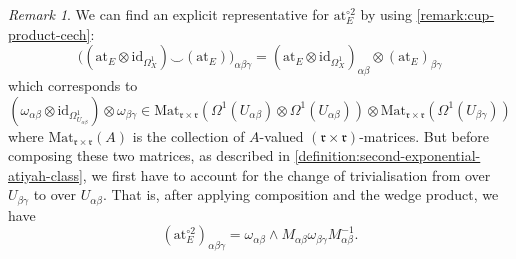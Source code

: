 \documentclass[11pt,fleqn]{article}
\theoremstyle{plain}
\theoremstyle{definition}
\theoremstyle{remark}
\newtheorem{remark}[theorem]{Remark}
\numberwithin{equation}{theorem}
\newcommand{\id}{\mathrm{id}}
\newcommand{\at}{\mathrm{at}}
\newcommand{\expat}[1]{\at^{\circ#1}}
\renewcommand{\matrix}{\mathrm{Mat}}
\begin{document}
        \begin{remark}\label{remark:have-to-change-base-for-higher-atiyah-class}
            We can find an explicit representative for $\expat{2}_E$ by using \cref{remark:cup-product-cech}:
            \[
                \big((\at_E\otimes\id_{\Omega_X^1})\smile(\at_E)\big)_{\alpha\beta\gamma}
                =
                \left(\at_E\otimes\id_{\Omega_X^1}\right)_{\alpha\beta}\otimes(\at_E)_{\beta\gamma}
            \]
            which corresponds to
            \[
                \left(\omega_{\alpha\beta}\otimes\id_{\Omega_{U_{\alpha\beta}}^1}\right)\otimes\omega_{\beta\gamma}
                \in
                \matrix_{\mathfrak{r}\times\mathfrak{r}}\left(
                    \Omega^1(U_{\alpha\beta}) \otimes \Omega^1(U_{\alpha\beta})
                \right) \otimes \matrix_{\mathfrak{r}\times\mathfrak{r}}\left(
                    \Omega^1(U_{\beta\gamma})
                \right)
            \]
            where $\matrix_{\mathfrak{r}\times\mathfrak{r}}(A)$ is the collection of $A$-valued $(\mathfrak{r}\times \mathfrak{r})$-matrices.
            But before composing these two matrices, as described in \cref{definition:second-exponential-atiyah-class}, we first have to account for the change of trivialisation from over $U_{\beta\gamma}$ to over $U_{\alpha\beta}$.
            That is, after applying composition and the wedge product, we have
            \begin{equation*}
                \left(\expat{2}_{E}\right)_{\alpha\beta\gamma} = \omega_{\alpha\beta}\wedge M_{\alpha\beta}\omega_{\beta\gamma}M_{\alpha\beta}^{-1}.
            \end{equation*}
        \end{remark}
\end{document}
